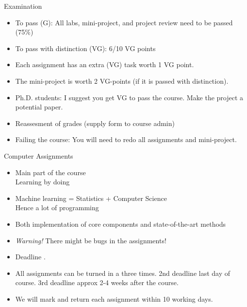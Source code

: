 \documentclass[10pt]{beamer}
\begin{document}
\begin{frame}{Examination}

\begin{itemize}
\item To pass (G): All labs, mini-project, and project review need to be passed (75\%)\pause
\item To pass with distinction (VG): 6/10 VG points\pause
\item Each assignment has an extra (VG) task worth 1 VG point.\pause
\item The mini-project is worth 2 VG-points (if it is passed with distinction).
\item Ph.D. students: I suggest you get VG to pass the course. Make the project a potential paper.
\item Reassesment of grades (supply form to course admin)
\item Failing the course: You will need to redo all assignments and mini-project.
\end{itemize}

\end{frame}


\begin{frame}{Computer Assignments}

\begin{itemize}
\item Main part of the course\\Learning by doing
\item Machine learning = Statistics + Computer Science\\Hence a lot of programming\pause
\item Both implementation of core components and state-of-the-art methods\pause
\item \emph{Warning!} There might be bugs in the assignments! \pause
\item Deadline .\pause
\item All assignments can be turned in a three times. 2nd deadline last day of course. 3rd deadline approx 2-4 weeks after the course. \pause
\item We will mark and return each assignment within 10 working days.
\end{itemize}
\end{frame}
\end{document}
